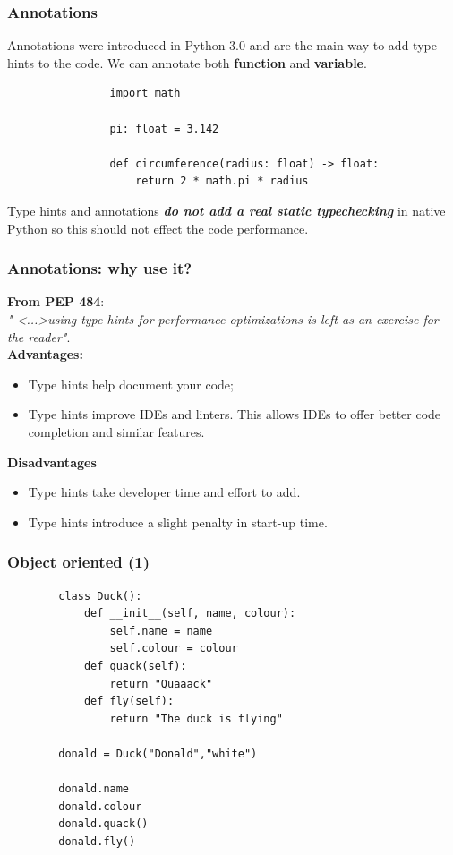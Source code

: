 \documentclass[xcolor ={table,usenames,dvipsnames}]{beamer}
\theoremstyle{definition}
\begin{document}
	\begin{frame}[fragile]
		\frametitle{Annotations}
			Annotations were introduced in Python 3.0 and are the main way to add type hints to the code. We can annotate both \textbf{function} and \textbf{variable}.
			
			\begin{lstlisting}
				import math
				
				pi: float = 3.142
				
				def circumference(radius: float) -> float:
					return 2 * math.pi * radius
			\end{lstlisting}
			
			Type hints and annotations \textbf{\textit{do not add a real static typechecking}} in native Python so this should not effect the code performance.\\
	\end{frame}

	\begin{frame}
		\frametitle{Annotations: why use it?}
		\textbf{From PEP 484}:\\
		\textit{" <...>using type hints for performance optimizations is left as an exercise for the reader"}.\\
		
		\textbf{Advantages:}
		\begin{itemize}
			\item Type hints help document your code;
			\item Type hints improve IDEs and linters. This allows IDEs to offer better code completion and similar features.
		\end{itemize}
		\textbf{Disadvantages}
		\begin{itemize}
			\item Type hints take developer time and effort to add.
			\item Type hints introduce a slight penalty in start-up time.
		\end{itemize}
	\end{frame}

	\begin{frame}[fragile]
		\frametitle{Object oriented (1)}
	\begin{lstlisting}
		class Duck():
			def __init__(self, name, colour):
				self.name = name
				self.colour = colour
			def quack(self):
				return "Quaaack"
			def fly(self):
				return "The duck is flying"
		
		donald = Duck("Donald","white")
				
		donald.name
		donald.colour
		donald.quack()
		donald.fly()
		\end{lstlisting}
	\end{frame}
\end{document}
